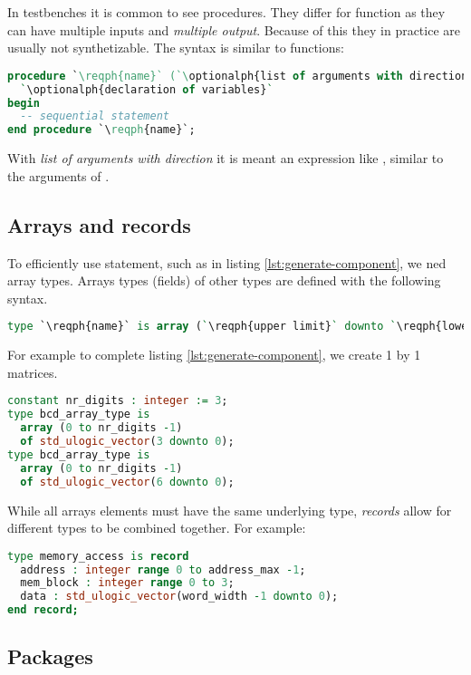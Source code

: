 \documentclass[margin=small]{tex/hsrzf}
\begin{document}
In testbenches it is common to see procedures. They differ for function as they can have multiple inputs and \emph{multiple output}. Because of this they in practice are usually not synthetizable. The syntax is similar to functions:
\begin{lstlisting}[language=vhdl]
procedure `\reqph{name}` (`\optionalph{list of arguments with direction}`) is
  `\optionalph{declaration of variables}`
begin
  -- sequential statement
end procedure `\reqph{name}`;
\end{lstlisting}
With \emph{list of arguments with direction} it is meant an expression like , similar to the arguments of .

\subsection{Arrays and records}

To efficiently use  statement, such as in listing \ref{lst:generate-component}, we ned array types. Arrays types (fields) of other types are defined with the following syntax.
\begin{lstlisting}[language=vhdl]
type `\reqph{name}` is array (`\reqph{upper limit}` downto `\reqph{lower limit}`) of `\reqph{base type}`;
\end{lstlisting}
For example to complete listing \ref{lst:generate-component}, we create 1 by 1 matrices.
\begin{lstlisting}[language = vhdl]
constant nr_digits : integer := 3;
type bcd_array_type is
  array (0 to nr_digits -1)
  of std_ulogic_vector(3 downto 0);
type bcd_array_type is
  array (0 to nr_digits -1)
  of std_ulogic_vector(6 downto 0);
\end{lstlisting}

While all arrays elements must have the same underlying type, \emph{records} allow for different types to be combined together.
For example:
\begin{lstlisting}[language = vhdl]
type memory_access is record
  address : integer range 0 to address_max -1;
  mem_block : integer range 0 to 3;
  data : std_ulogic_vector(word_width -1 downto 0);
end record;
\end{lstlisting}

\subsection{Packages}
\end{document}
